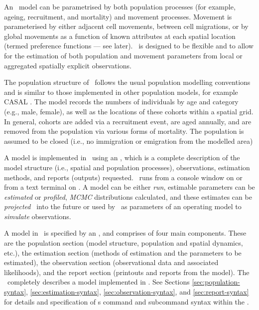 An \SPM\ model can be parametrised by both population processes (for example, ageing, recruitment, and mortality) and movement processes. Movement is parameterised by either adjacent cell movements, between cell migrations, or by global movements as a function of known attributes at each spatial location (termed preference functions --- see later). \SPM\ is designed to be flexible and to allow for the estimation of both population and movement parameters from local or aggregated spatially explicit observations. 

The population structure of \SPM\ follows the usual population modelling conventions and is similar to those implemented in other population models, for example CASAL  \citep{1388}. The model records the numbers of individuals by age and category (e.g., male, female), as well as the locations of these cohorts within a spatial grid. In general, cohorts are added via a recruitment event, are aged annually, and are removed from the population via various forms of mortality. The population is assumed to be closed (i.e., no immigration or emigration from the modelled area)

A model is implemented in \SPM\ using an \config {}, which is a complete description of the model structure (i.e., spatial and population processes), observations, estimation methods, and reports (outputs) requested. \SPM\ runs from a console window on  or from a text terminal on . A model can be either \emph{run}, estimable parameters can be \emph{estimated} or \emph{profiled}, \emph{MCMC} distributions calculated, and these estimates can be \emph{projected} \NYI\ into the future or used by \SPM\ as parameters of an operating model to \emph{simulate} observations.

A model in \SPM\ is specified by an \config, and comprises of four main components. These are the population section (model structure, population and spatial dynamics, etc.), the estimation section (methods of estimation and the parameters to be estimated), the observation section (observational data and associated likelihoods), and the report section (printouts and reports from the model). The \config\  completely describes a model implemented in \SPM. See Sections \ref{sec:population-syntax}, \ref{sec:estimation-syntax}, \ref{sec:observation-syntax}, and \ref{sec:report-syntax} for details and specification of \SPM s command and subcommand syntax within the \config. 

